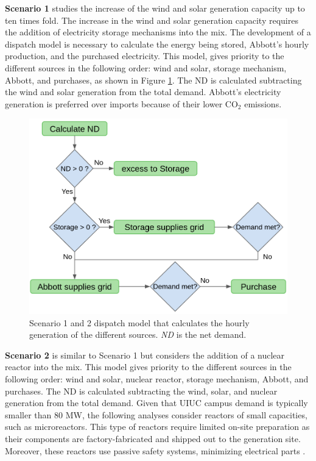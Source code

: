 \documentclass{anstrans}
\begin{document}
\textbf{Scenario 1} studies the increase of the wind and solar generation capacity up to ten times fold.
The increase in the wind and solar generation capacity requires the addition of electricity storage mechanisms into the mix.
The development of a dispatch model is necessary to calculate the energy being stored, Abbott's hourly production, and the purchased electricity.
This model, gives priority to the different sources in the following order: wind and solar, storage mechanism, Abbott, and purchases, as shown in Figure \ref{fig:dispatch-model}.
The \gls{ND} is calculated subtracting the wind and solar generation from the total demand.
Abbott’s electricity generation is preferred over imports because of their lower CO$_2$ emissions.

\begin{figure}[htbp!] %
    \centering
    \includegraphics[width=0.90\linewidth]{figures/dispatch-model}
    \hfill
    \caption{Scenario 1 and 2 dispatch model that calculates the hourly generation of the different sources. \textit{ND} is the net demand.}
    \label{fig:dispatch-model}
\end{figure}

\textbf{Scenario 2} is similar to Scenario 1 but considers the addition of a nuclear reactor into the mix.
This model gives priority to the different sources in the following order: wind and solar, nuclear reactor, storage mechanism, Abbott, and purchases.
The \gls{ND} is calculated subtracting the wind, solar, and nuclear generation from the total demand.
Given that UIUC campus demand is typically smaller than 80 MW, the following analyses consider reactors of small capacities, such as microreactors.
This type of reactors require limited on-site preparation as their components are factory-fabricated and shipped out to the generation site.
Moreover, these reactors use passive safety systems, minimizing electrical parts \cite{us-doe_ultimate_2019}.
\end{document}
